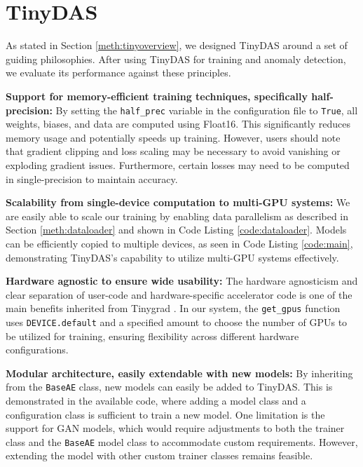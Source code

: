 \section{TinyDAS}
\label{disc:tinydas}

As stated in Section \ref{meth:tinyoverview}, we designed TinyDAS around a set of guiding philosophies. After using TinyDAS for training and anomaly detection, we evaluate its performance against these principles.

\textbf{Support for memory-efficient training techniques, specifically half-precision:}
By setting the \lstinline|half_prec| variable in the configuration file to \lstinline|True|, all weights, biases, and data are computed using Float16. This significantly reduces memory usage and potentially speeds up training. However, users should note that gradient clipping and loss scaling may be necessary to avoid vanishing or exploding gradient issues. Furthermore, certain losses may need to be computed in single-precision to maintain accuracy.

\textbf{Scalability from single-device computation to multi-GPU systems:}
We are easily able to scale our training by enabling data parallelism as described in Section \ref{meth:dataloader} and shown in Code Listing \ref{code:dataloader}. Models can be efficiently copied to multiple devices, as seen in Code Listing \ref{code:main}, demonstrating TinyDAS's capability to utilize multi-GPU systems effectively.

\textbf{Hardware agnostic to ensure wide usability:}
The hardware agnosticism and clear separation of user-code and hardware-specific accelerator code is one of the main benefits inherited from Tinygrad \cite{tinygrad}. In our system, the \lstinline|get_gpus| function uses \lstinline|DEVICE.default| and a specified amount to choose the number of GPUs to be utilized for training, ensuring flexibility across different hardware configurations.

\textbf{Modular architecture, easily extendable with new models:}
By inheriting from the \lstinline|BaseAE| class, new models can easily be added to TinyDAS. This is demonstrated in the available code, where adding a model class and a configuration class is sufficient to train a new model. One limitation is the support for GAN models, which would require adjustments to both the trainer class and the \lstinline|BaseAE| model class to accommodate custom requirements. However, extending the model with other custom trainer classes remains feasible.

